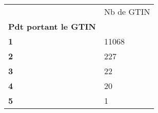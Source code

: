 \begin{tabularx}{\linewidth}{lX}
\toprule
{} &  Nb de GTIN \\
\textbf{Pdt portant le GTIN} &             \\
\midrule
\textbf{1                  } &       11068 \\
\textbf{2                  } &         227 \\
\textbf{3                  } &          22 \\
\textbf{4                  } &          20 \\
\textbf{5                  } &           1 \\
\bottomrule
\end{tabularx}
